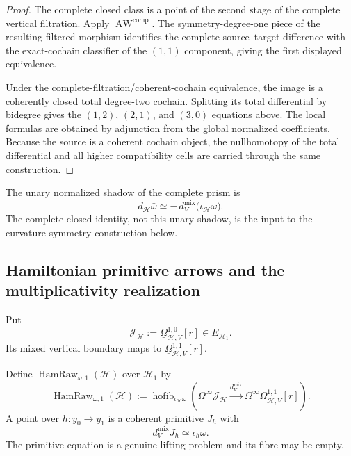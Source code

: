 \begin{proof}
The complete closed class is a point of the second stage of the complete vertical
filtration.  Apply $\operatorname{AW}^{\mathrm{comp}}$.  The symmetry-degree-one
piece of the resulting filtered morphism identifies the complete source--target
difference with the exact-cochain classifier of the $(1,1)$ component, giving
the first displayed equivalence.

Under the complete-filtration/coherent-cochain equivalence, the image is a
coherently closed total degree-two cochain.  Splitting its total differential by
bidegree gives the $(1,2)$, $(2,1)$, and $(3,0)$ equations above.  The local
formulas are obtained by adjunction from the global normalized coefficients.
Because the source is a coherent cochain object, the nullhomotopy of the total
differential and all higher compatibility cells are carried through the same
construction.
\end{proof}

\begin{theorem}
\label{thm:prequantum-cartan-homotopy-formula}
The unary normalized shadow of the complete prism is
\[
\boxed{
d_{\mathcal H}\bar\omega
\simeq
-\,d_V^{\mathrm{mix}}
\bigl(\iota_{\mathcal H}\omega\bigr).
}
\]
The complete closed identity, not this unary shadow, is the input to the
curvature-symmetry construction below.
\end{theorem}

\subsection{Hamiltonian primitive arrows and the multiplicativity realization}
\label{subsec:prequantum-hamiltonian-primitive-arrows}

Put
\[
\mathscr J_{\mathcal H}
:=
\underline\Omega^{1,0}_{\mathcal H,V}[r]
\in E_{\mathcal H_1}.
\]
Its mixed vertical boundary maps to
$\underline\Omega^{1,1}_{\mathcal H,V}[r]$.

\begin{definition}
\label{def:prequantum-raw-hamiltonian-arrow-object}
Define $\operatorname{HamRaw}_{\omega,1}(\mathcal H)$ over $\mathcal H_1$ by
\[
\boxed{
\operatorname{HamRaw}_{\omega,1}(\mathcal H)
:=
\operatorname{hofib}_{\iota_{\mathcal H}\omega}
\left(
\Omega^\infty\mathscr J_{\mathcal H}
\xrightarrow{d_V^{\mathrm{mix}}}
\Omega^\infty\underline\Omega^{1,1}_{\mathcal H,V}[r]
\right).
}
\]
A point over $h:y_0\to y_1$ is a coherent primitive $J_h$ with
\[
d_V^{\mathrm{mix}}J_h\simeq\iota_h\omega.
\]
The primitive equation is a genuine lifting problem and its fibre may be empty.
\end{definition}

